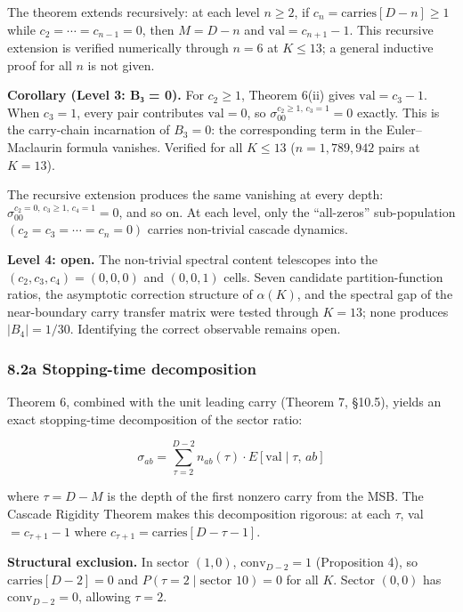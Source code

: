\documentclass[
  11pt,
]{article}
\begin{document}
The theorem extends recursively: at each level \(n \geq 2\), if
\(c_n = \text{carries}[D-n] \geq 1\) while \(c_2 = \cdots = c_{n-1} = 0\), then
\(M = D-n\) and \(\text{val} = c_{n+1} - 1\). This recursive extension is
verified numerically through \(n = 6\) at \(K \leq 13\); a general inductive
proof for all \(n\) is not given.

\textbf{Corollary (Level 3: B₃ = 0).} For \(c_2 \geq 1\), Theorem 6(ii) gives
\(\text{val} = c_3 - 1\). When \(c_3 = 1\), every pair contributes
\(\text{val} = 0\), so \(\sigma_{00}^{c_2 \geq 1,\, c_3 = 1} = 0\) exactly. This
is the carry-chain incarnation of \(B_3 = 0\): the corresponding term in the
Euler--Maclaurin formula vanishes. Verified for all \(K \leq 13\)
(\(n = 1{,}789{,}942\) pairs at \(K = 13\)).

The recursive extension produces the same vanishing at every depth:
\(\sigma_{00}^{c_2 = 0,\, c_3 \geq 1,\, c_4 = 1} = 0\), and so on. At each
level, only the ``all-zeros'' sub-population \((c_2 = c_3 = \cdots = c_n = 0)\)
carries non-trivial cascade dynamics.

\textbf{Level 4: open.} The non-trivial spectral content telescopes into the
\((c_2, c_3, c_4) = (0,0,0)\) and \((0,0,1)\) cells. Seven candidate
partition-function ratios, the asymptotic correction structure of \(\alpha(K)\),
and the spectral gap of the near-boundary carry transfer matrix were tested
through \(K = 13\); none produces \(|B_4| = 1/30\). Identifying the correct
observable remains open.

\subsubsection{8.2a Stopping-time
decomposition}\label{a-stopping-time-decomposition}

Theorem 6, combined with the unit leading carry (Theorem 7, §10.5), yields an
exact stopping-time decomposition of the sector ratio:

\[\sigma_{ab} = \sum_{\tau=2}^{D-2} n_{ab}(\tau) \cdot E[\text{val} \mid \tau,\, ab]\]

where \(\tau = D - M\) is the depth of the first nonzero carry from the MSB. The
Cascade Rigidity Theorem makes this decomposition rigorous: at each \(\tau\),
val \(= c_{\tau+1} - 1\) where \(c_{\tau+1} = \text{carries}[D-\tau-1]\).

\textbf{Structural exclusion.} In sector \((1,0)\), \(\text{conv}_{D-2} = 1\)
(Proposition 4), so \(\text{carries}[D-2] = 0\) and
\(P(\tau = 2 \mid \text{sector } 10) = 0\) for all \(K\). Sector \((0,0)\) has
\(\text{conv}_{D-2} = 0\), allowing \(\tau = 2\).
\end{document}
